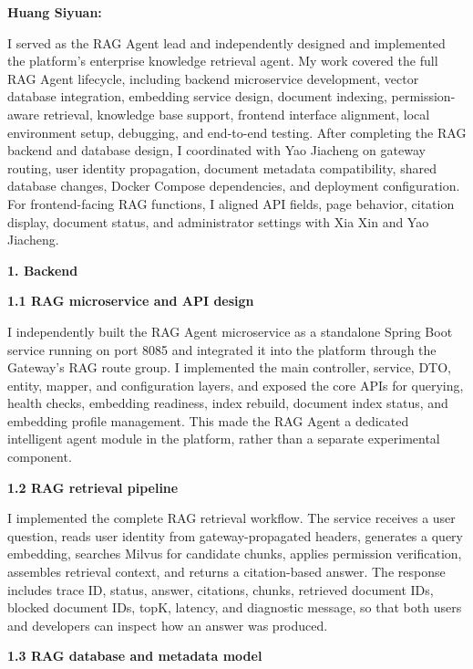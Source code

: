 \vspace{4mm}

\noindent\textbf{Huang Siyuan:}

\vspace{2mm}

I served as the RAG Agent lead and independently designed and implemented the platform’s enterprise knowledge retrieval agent. My work covered the full RAG Agent lifecycle, including backend microservice development, vector database integration, embedding service design, document indexing, permission-aware retrieval, knowledge base support, frontend interface alignment, local environment setup, debugging, and end-to-end testing. After completing the RAG backend and database design, I coordinated with Yao Jiacheng on gateway routing, user identity propagation, document metadata compatibility, shared database changes, Docker Compose dependencies, and deployment configuration. For frontend-facing RAG functions, I aligned API fields, page behavior, citation display, document status, and administrator settings with Xia Xin and Yao Jiacheng.

\textbf{1. Backend}

\textbf{1.1 RAG microservice and API design}

I independently built the RAG Agent microservice as a standalone Spring Boot service running on port 8085 and integrated it into the platform through the Gateway's RAG route group. I implemented the main controller, service, DTO, entity, mapper, and configuration layers, and exposed the core APIs for querying, health checks, embedding readiness, index rebuild, document index status, and embedding profile management. This made the RAG Agent a dedicated intelligent agent module in the platform, rather than a separate experimental component.

\textbf{1.2 RAG retrieval pipeline}

I implemented the complete RAG retrieval workflow. The service receives a user question, reads user identity from gateway-propagated headers, generates a query embedding, searches Milvus for candidate chunks, applies permission verification, assembles retrieval context, and returns a citation-based answer. The response includes trace ID, status, answer, citations, chunks, retrieved document IDs, blocked document IDs, topK, latency, and diagnostic message, so that both users and developers can inspect how an answer was produced.

\textbf{1.3 RAG database and metadata model}

